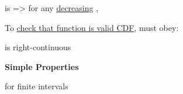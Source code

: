 \hSep

 
\begin{enumerate}
    \vItem {} is  => for any \ul{decreasing} ,

    \vItem To \ul{check that function is valid CDF}, must obey:
    \begin{enumerate}
        \vItem {}
        \vItem {}
        \vItem {} is right-continuous
    \end{enumerate}

    \vItem \textbf{Simple Properties}
    \begin{enumerate}
        \vItem {}
        \vItem {} for 
        finite intervals \iMbox{(a, b] \subseteq \mathbb{R}}
        
    \end{enumerate}
\end{enumerate}
